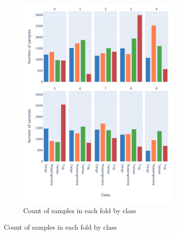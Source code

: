 \begin{figure}[htbp]
    \centering
    \begin{subfigure}[t]{\textwidth}
        \centering
        \includegraphics[width=0.90\textwidth]{img/ch3/deepship_figs/10_folds_counts_facet.pdf}
        \caption{Count of samples in each fold by class}
        \label{fig:10-fold-counts}
    \end{subfigure}
\end{figure}
